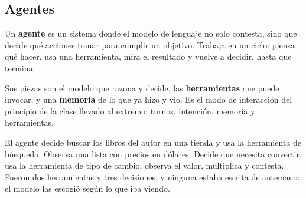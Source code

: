 \documentclass[11pt,letterpaper]{article}
\begin{document}

\subsection*{Agentes}

Un \textbf{agente} es un sistema donde el modelo de lenguaje no solo
contesta, sino que decide qué acciones tomar para cumplir un objetivo.
Trabaja en un ciclo: piensa qué hacer, usa una herramienta, mira el
resultado y vuelve a decidir, hasta que termina.

\begin{center}
\end{center}

Sus piezas son el modelo que razona y decide, las
\textbf{herramientas} que puede invocar, y una \textbf{memoria} de lo
que ya hizo y vio. Es el modo de interacción del principio de la clase
llevado al extremo: turnos, intención, memoria y herramientas.

\begin{ejemplo}
    El agente decide buscar los libros del autor en una tienda y usa la
    herramienta de búsqueda. Observa una lista con precios en dólares.
    Decide que necesita convertir, usa la herramienta de tipo de
    cambio, observa el valor, multiplica y contesta. Fueron dos
    herramientas y tres decisiones, y ninguna estaba escrita de
    antemano: el modelo las escogió según lo que iba viendo.
\end{ejemplo}
\end{document}
